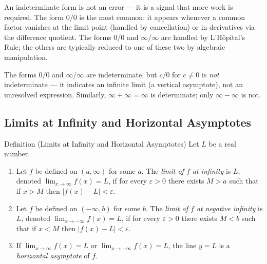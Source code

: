\begin{remark*}
An indeterminate form is not an error --- it is a signal that
more work is required.
The form $0/0$ is the most common: it appears whenever a common
factor vanishes at the limit point (handled by cancellation)
or in derivatives via the difference quotient.
The forms $0/0$ and $\infty/\infty$ are handled by
L'H\^opital's Rule; the others are typically reduced to one
of these two by algebraic manipulation.
\end{remark*}

\begin{remark*}
The forms $0/0$ and $\infty/\infty$ are indeterminate, but $c/0$
for $c \neq 0$ is \emph{not} indeterminate --- it indicates an
infinite limit (a vertical asymptote), not an unresolved
expression.
Similarly, $\infty + \infty = \infty$ is determinate; only
$\infty - \infty$ is not.
\end{remark*}

\subsection*{Limits at Infinity and Horizontal Asymptotes}

\begin{propositionbox}{Definition (Limits at Infinity and Horizontal Asymptotes)}
Let $L$ be a real number.
\begin{enumerate}
  \item Let $f$ be defined on $(a, \infty)$ for some $a$.
        The \emph{limit of $f$ at infinity} is $L$, denoted
        $\lim_{x \to \infty} f(x) = L$, if for every
        $\varepsilon > 0$ there exists $M > a$ such that if
        $x > M$ then $|f(x) - L| < \varepsilon$.

  \item Let $f$ be defined on $(-\infty, b)$ for some $b$.
        The \emph{limit of $f$ at negative infinity} is $L$,
        denoted $\lim_{x \to -\infty} f(x) = L$, if for every
        $\varepsilon > 0$ there exists $M < b$ such that if
        $x < M$ then $|f(x) - L| < \varepsilon$.

  \item If $\lim_{x \to \infty} f(x) = L$ or
        $\lim_{x \to -\infty} f(x) = L$, the line $y = L$ is a
        \emph{horizontal asymptote} of $f$.
\end{enumerate}
\end{propositionbox}

